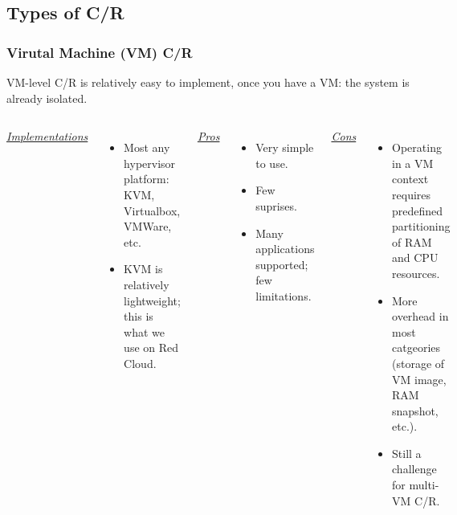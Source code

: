 \documentclass[compress]{beamer}
\begin{document}


\subsection{Types of C/R}   %



\begin{frame}
\frametitle{Virutal Machine (VM) C/R}
VM-level C/R is relatively easy to implement, once you have a VM: the
system is already isolated.
\begin{columns}[t]
\ul{\textit{Implementations}}
\begin{itemize}
\item Most any hypervisor platform: KVM, Virtualbox, VMWare, etc.
\item KVM is relatively lightweight; this is what we use on Red Cloud.
\end{itemize}

\ul{\textit{Pros}}
\begin{itemize}
\item Very simple to use.
\item Few suprises.
\item Many applications supported; few limitations.
\end{itemize}

\ul{\textit{Cons}}
\begin{itemize}
\item Operating in a VM context requires predefined partitioning of RAM and CPU
resources.
\item More overhead in most catgeories (storage of VM image, RAM snapshot, etc.).
\item Still a challenge for multi-VM C/R.
\end{itemize}

\end{columns}
\end{frame}
  

\end{document}
